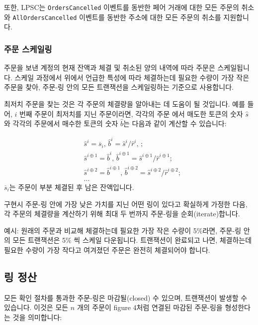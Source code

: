 \documentclass[UTF8,nofonts]{article}
\makeatletter
\newenvironment{figurehere}
 {\def\@captype{figure}}
 {}
\makeatother
\begin{document}
\begin{multicols}{2}
또한, LPSC는 \verb|OrdersCancelled| 이벤트를 동반한 페어 거래에 대한 모든 주문의 취소와 \verb|AllOrdersCancelled| 이벤트를 동반한 주소에 대한 모든 주문의 취소를 지원합니다.


\subsubsection{주문 스케일링\label{sec:order_scaling}}
주문을 보낸 계정의 현재 잔액과 체결 및 취소된 양의 내역에 따라 주문은 스케일됩니다. 스케일 과정에서 위에서 언급한 특성에 따라 체결하는데 필요한 수량이 가장 작은 주문을 찾아, 주문-링 안의 모든 트랜잭션을 스케일링하는 기준으로 사용합니다.

최저치 주문을 찾는 것은 각 주문의 체결량을 알아내는 데 도움이 될 것입니다. 예를 들어, $i$ 번째 주문이 최저치를 지닌 주문이라면, 각각의 주문 에서 매도한 토큰의 숫자 $\hat{s}$ 와 각각의 주문에서 매수한 토큰의 숫자 $\hat{b}$는 다음과 같이 계산할 수 있습니다: 

\[
\begin{split}
&\hat{s}^{i}=\overline{s}_i\text{, } \hat{b}^{i}=\hat{s}^{i}/ \hat{r}^i\text{, }\text{;}\\
&\hat{s}^{i\oplus 1}=\hat{b}^i\text{, } \hat{b}^{i\oplus 1}=\hat{s}^{i\oplus 1}/ \hat{r}^{i\oplus 1}\text{;}\\
&\hat{s}^{i\oplus 2}=\hat{b}^{i\oplus 1}\text{, } \hat{b}^{i\oplus 2}=\hat{s}^{i\oplus 2}/ \hat{r}^{i\oplus 2}\text{;}\\
& ...
\end{split}
\]
$\overline{s}_i$는 주문이 부분 체결된 후 남은 잔액입니다.

구현시 주문-링 안에 가장 낮은 가치를 지닌 어떤 링이 있다고 확실하게 가정한 다음, 각 주문의 체결량을 계산하기 위해 최대 두 번까지 주문-링을 순회(iterate)합니다. 

예시: 원래의 주문과 비교해 체결하는데 필요한 가장 작은 수량이 5\%라면, 주문-링 안의 모든 트랜잭션은 5\% 씩 스케일 다운됩니다. 트랜잭션이 완료되고 나면, 체결하는데 필요한 수량이 가장 작다고 여겨졌던 주문은 완전히 체결되어야 합니다.

\subsection{링 정산\label{sec:settlement}}
모든 확인 절차를 통과한 주문-링은 마감될(closed) 수 있으며, 트랜잭션이 발생할 수 있습니다. 이것은 모든 $n$ 개의 주문이 figure 4처럼 연결된 마감된 주문-링을 형성한다는 것을 의미합니다:  


\begin{center}
\begin{figurehere}
\centering
\begin{tikzpicture}[
circle/.style={
		scale=0.75,
		rounded corners,
		draw=black, 
		text centered,
		}
]


\end{tikzpicture}
\end{figurehere}
\end{center}
\end{multicols}
\end{document}
